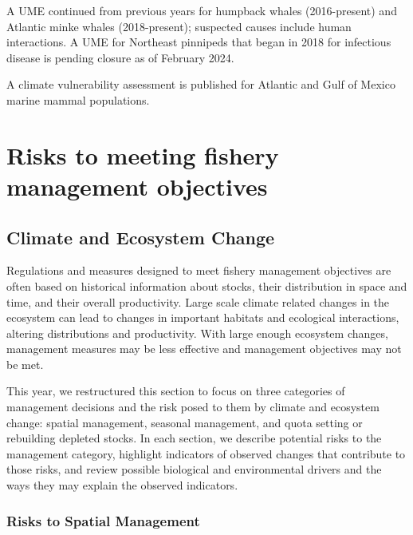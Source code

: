 \documentclass[
  10pt,
]{article}
\begin{document}
A UME continued from previous years for humpback whales (2016-present) and Atlantic minke whales (2018-present); suspected causes include human interactions. A UME for Northeast pinnipeds that began in 2018 for infectious disease is pending closure as of February 2024.

A climate vulnerability assessment is published for Atlantic and Gulf of Mexico marine mammal populations.

\newpage

\hypertarget{risks-to-meeting-fishery-management-objectives}{%
\section{Risks to meeting fishery management objectives}\label{risks-to-meeting-fishery-management-objectives}}

\hypertarget{climate-and-ecosystem-change}{%
\subsection{Climate and Ecosystem Change}\label{climate-and-ecosystem-change}}

Regulations and measures designed to meet fishery management objectives are often based on historical information about stocks, their distribution in space and time, and their overall productivity. Large scale climate related changes in the ecosystem can lead to changes in important habitats and ecological interactions, altering distributions and productivity. With large enough ecosystem changes, management measures may be less effective and management objectives may not be met.

This year, we restructured this section to focus on three categories of management decisions and the risk posed to them by climate and ecosystem change: spatial management, seasonal management, and quota setting or rebuilding depleted stocks. In each section, we describe potential risks to the management category, highlight indicators of observed changes that contribute to those risks, and review possible biological and environmental drivers and the ways they may explain the observed indicators.

\hypertarget{risks-to-spatial-management}{%
\subsubsection{Risks to Spatial Management}\label{risks-to-spatial-management}}
\end{document}
